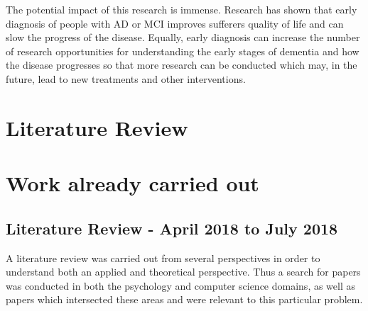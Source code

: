 \documentclass{article}
\begin{document}
	\newline
	\par
	The potential impact of this research is immense. Research has shown that early diagnosis of people with AD or MCI improves sufferers quality of life and can slow the progress of the disease. Equally, early diagnosis can increase the number of research opportunities for understanding the early stages of dementia and how the disease progresses so that more research can be conducted which may, in the future, lead to new treatments and other interventions.
	
	\section{Literature Review}
	
	\section{Work already carried out}
	
	\subsection{Literature Review - April 2018 to July 2018}
	A literature review was carried out from several perspectives in order to understand both an applied and theoretical perspective. Thus a search for papers was conducted in both the psychology and computer science domains, as well as papers which intersected these areas and were relevant to this particular problem.
	
\end{document}
